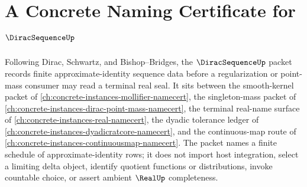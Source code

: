 \chapter{A Concrete Naming Certificate for $\DiracSequenceUp$}
\label{ch:concrete-instances-dirac-sequence-namecert}

Following Dirac, Schwartz, and Bishop--Bridges, the $\DiracSequenceUp$ packet records finite approximate-identity sequence data before a regularization or point-mass consumer may read a terminal real seal. It sits between the smooth-kernel packet of \autoref{ch:concrete-instances-mollifier-namecert}, the singleton-mass packet of \autoref{ch:concrete-instances-dirac-point-mass-namecert}, the terminal real-name surface of \autoref{ch:concrete-instances-real-namecert}, the dyadic tolerance ledger of \autoref{ch:concrete-instances-dyadicratcore-namecert}, and the continuous-map route of \autoref{ch:concrete-instances-continuousmap-namecert}. The packet names a finite schedule of approximate-identity rows; it does not import host integration, select a limiting delta object, identify quotient functions or distributions, invoke countable choice, or assert ambient $\RealUp$ completeness.

